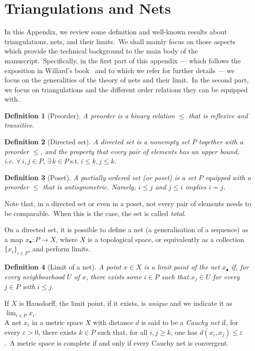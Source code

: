 \documentclass[11pt]{article}
\newtheorem{definition}{Definition}[section]
\theoremstyle{definition}
\numberwithin{equation}{section}
\begin{document}
\appendix

\section{Triangulations and Nets}
\label{App:Triang}
In this Appendix, we review some definition and well-known results about triangulations, nets, and their limits.~We shall mainly focus on those aspects which provide the technical background to the main body of the manuscript.~Specifically, in the first part of this appendix --- which follows the exposition in Willard's book~\cite{Willard_2004} and to which we refer for further details --- we focus on the generalities of the theory of nets and their limit.~In the second part, we focus on triangulations and the different order relations they can be equipped with.
\begin{definition}[Preorder]
    A preorder is a binary relation $\leq$ that is reflexive and transitive.
\end{definition}

\begin{definition}[Directed set]
    A directed set is a nonempty set $P$ together with a preorder $\leq$, and the property that every pair of elements has an upper bound, i.e. $\forall\,i,j\in P,\,\exists\,k\in P\ \mathrm{s.t.}\ i\leq k, j\leq k.$ 
\end{definition}

\begin{definition}[Poset]
    A partially ordered set (or poset) is a set $P$ equipped with a preorder $\leq$ that is antisymmetric. Namely, $i\leq j$ and $j\leq i$ implies $i=j$.
\end{definition}
Note that, in a directed set or even in a poset, not every pair of elements needs to be comparable.~When this is the case, the set is called \textit{total}.

On a directed set, it is possible to define a net (a generalisation of a sequence) as a map $x_{\bullet}:P\to X$, where $X$ is a topological space, or equivalently as a collection $\{x_i\}_{i\in P}$, and perform limits. 
\begin{definition}[Limit of a net]
    A point $x\in X$ is a limit point of the net $x_{\bullet}$ if, for every neighbourhood $U$ of $x$, there exists some $i\in P$ such that $x_j\in U$ for every $j\in P$ with $i\leq j$.
\end{definition}
If $X$ is Hausdorff, the limit point, if it exists, is \emph{unique} and we indicate it as $\lim_{i\in P}x_i$.\\
A net $x_i$ in a metric space $X$ with distance $d$ is said to be a \emph{Cauchy net} if, for every $\varepsilon>0$, there exists $k\in P$ such that, for all $i,j\geq k$, one has $d(x_i,x_j)\leq\varepsilon$.~A metric space is complete if and only if every Cauchy net is convergent.
\end{document}
